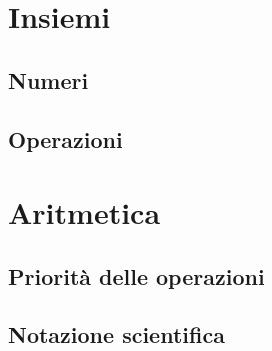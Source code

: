 \documentclass[
finale,
ssectnum,
]{DossierExMathIta}
\author{CPT}
\date{2020}
\begin{document}
\setlength{\columnsep}{0.6cm}
\indice


\section{Insiemi}
\subsection{Numeri}
\begin{questions}

\end{questions}


\subsection{Operazioni}
\begin{questions}

\end{questions}


\exnewpage



\section{Aritmetica}
\subsection{Priorità delle operazioni}
\begin{questions}
	
\end{questions}

\subsection{Notazione scientifica}
\begin{questions}
	
\end{questions}
\end{document}
